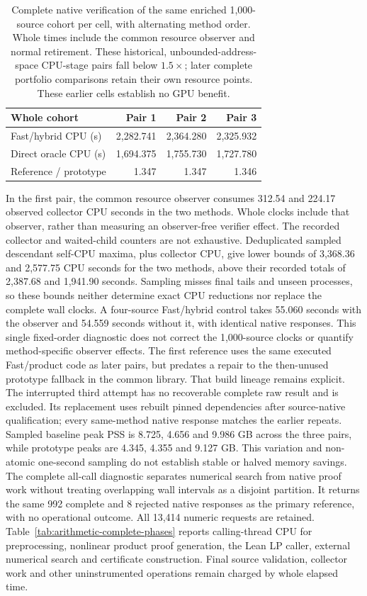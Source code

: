 \documentclass[10pt,twocolumn]{article}
\begin{document}
\begin{table}[t]
\centering
\small
\begin{tabular}{@{}lrrr@{}}
\toprule
Whole cohort & Pair 1 & Pair 2 & Pair 3 \\
\midrule
Fast/hybrid CPU (s) & 2,282.741 & 2,364.280 & 2,325.932 \\
Direct oracle CPU (s) & 1,694.375 & 1,755.730 & 1,727.780 \\
Reference / prototype & 1.347 & 1.347 & 1.346 \\
\bottomrule
\end{tabular}
\caption{Complete native verification of the same enriched 1,000-source
cohort per cell, with alternating method order. Whole times include the common
resource observer and normal retirement. These historical, unbounded-address-space CPU-stage pairs fall below $1.5\times$; later complete portfolio
comparisons retain their own resource points. These earlier cells establish no GPU benefit.}
\label{tab:arithmetic-direct-pairs}
\end{table}

In the first pair, the common resource observer consumes 312.54 and 224.17 observed collector
CPU seconds in the two methods. Whole clocks include that observer, rather
than measuring an observer-free verifier effect.
The recorded collector and waited-child counters are not exhaustive.
Deduplicated sampled descendant self-CPU maxima, plus collector CPU,
give lower bounds of 3,368.36 and 2,577.75 CPU seconds for the two methods,
above their recorded totals of 2,387.68 and 1,941.90 seconds.
Sampling misses final tails and unseen processes, so these bounds neither
determine exact CPU reductions nor replace the complete wall clocks.
A four-source Fast/hybrid control takes 55.060 seconds with the observer and
54.559 seconds without it, with identical native responses.
This single fixed-order diagnostic does not correct the 1,000-source clocks
or quantify method-specific observer effects.
The first reference uses the same executed Fast/product code as later pairs,
but predates a repair to the then-unused prototype fallback in the common
library. That build lineage remains explicit.
The interrupted third attempt has no recoverable complete raw result and is
excluded. Its replacement uses rebuilt pinned dependencies after source-native
qualification; every same-method native response matches the earlier repeats.
Sampled baseline peak PSS is 8.725, 4.656 and 9.986 GB across the three pairs,
while prototype peaks are 4.345, 4.355 and 9.127 GB.
This variation and non-atomic one-second sampling do not establish stable
or halved memory savings.
The complete all-call diagnostic separates numerical search from native proof
work without treating overlapping wall intervals as a disjoint partition.
It returns the same 992 complete and 8 rejected native responses as the primary
reference, with no operational outcome. All 13,414 numeric requests are retained.
Table~\ref{tab:arithmetic-complete-phases} reports calling-thread CPU for
preprocessing, nonlinear product proof generation, the Lean LP caller,
external numerical search and certificate construction.
Final source validation, collector work and other uninstrumented operations
remain charged by whole elapsed time.
\end{document}
